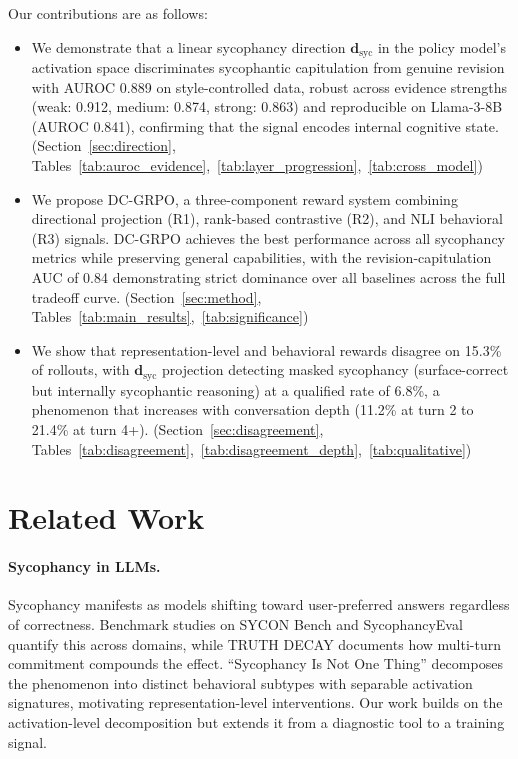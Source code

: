 \documentclass[11pt]{article}
\begin{document}
Our contributions are as follows:
\begin{itemize}
    \item We demonstrate that a linear sycophancy direction $\mathbf{d}_\text{syc}$ in the policy model's activation space discriminates sycophantic capitulation from genuine revision with AUROC 0.889 on style-controlled data, robust across evidence strengths (weak: 0.912, medium: 0.874, strong: 0.863) and reproducible on Llama-3-8B (AUROC 0.841), confirming that the signal encodes internal cognitive state. (Section~\ref{sec:direction}, Tables~\ref{tab:auroc_evidence},~\ref{tab:layer_progression},~\ref{tab:cross_model})
    \item We propose DC-GRPO, a three-component reward system combining directional projection (R1), rank-based contrastive (R2), and NLI behavioral (R3) signals. DC-GRPO achieves the best performance across all sycophancy metrics while preserving general capabilities, with the revision-capitulation AUC of 0.84 demonstrating strict dominance over all baselines across the full tradeoff curve. (Section~\ref{sec:method}, Tables~\ref{tab:main_results},~\ref{tab:significance})
    \item We show that representation-level and behavioral rewards disagree on 15.3\% of rollouts, with $\mathbf{d}_\text{syc}$ projection detecting masked sycophancy (surface-correct but internally sycophantic reasoning) at a qualified rate of 6.8\%, a phenomenon that increases with conversation depth (11.2\% at turn 2 to 21.4\% at turn 4+). (Section~\ref{sec:disagreement}, Tables~\ref{tab:disagreement},~\ref{tab:disagreement_depth},~\ref{tab:qualitative})
\end{itemize}

\section{Related Work}

\paragraph{Sycophancy in LLMs.}
Sycophancy manifests as models shifting toward user-preferred answers regardless of correctness. Benchmark studies on SYCON Bench and SycophancyEval quantify this across domains, while TRUTH DECAY documents how multi-turn commitment compounds the effect. ``Sycophancy Is Not One Thing'' decomposes the phenomenon into distinct behavioral subtypes with separable activation signatures, motivating representation-level interventions. Our work builds on the activation-level decomposition but extends it from a diagnostic tool to a training signal.
\end{document}
